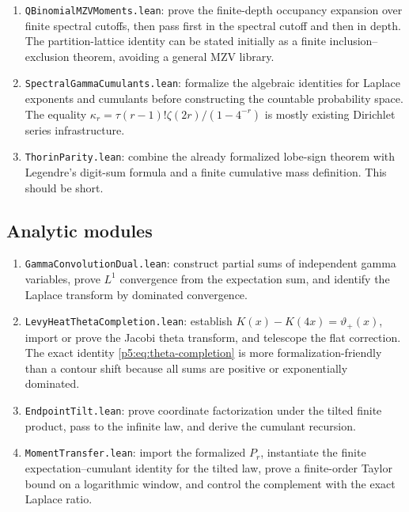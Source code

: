\documentclass[11pt]{article}
\numberwithin{equation}{section}
\theoremstyle{definition}
\theoremstyle{remark}
\begin{document}
\begin{enumerate}
\item \texttt{QBinomialMZVMoments.lean}: prove the finite-depth occupancy
      expansion over finite spectral cutoffs, then pass first in the spectral
      cutoff and then in depth.  The partition-lattice identity can be stated
      initially as a finite inclusion--exclusion theorem, avoiding a general
      MZV library.
\item \texttt{SpectralGammaCumulants.lean}: formalize the algebraic identities
      for Laplace exponents and cumulants before constructing the countable
      probability space.  The equality
      $\kappa_r=\tau(r-1)!\zeta(2r)/(1-4^{-r})$ is mostly existing Dirichlet
      series infrastructure.
\item \texttt{ThorinParity.lean}: combine the already formalized lobe-sign
      theorem with Legendre's digit-sum formula and a finite cumulative mass
      definition.  This should be short.
\end{enumerate}

\subsection{Analytic modules}

\begin{enumerate}
\item \texttt{GammaConvolutionDual.lean}: construct partial sums of independent
      gamma variables, prove $L^1$ convergence from the expectation sum, and
      identify the Laplace transform by dominated convergence.
\item \texttt{LevyHeatThetaCompletion.lean}: establish
      $K(x)-K(4x)=\vartheta_+(x)$, import or prove the Jacobi theta transform,
      and telescope the flat correction.  The exact identity
      \cref{p5:eq:theta-completion} is more formalization-friendly than a contour
      shift because all sums are positive or exponentially dominated.
\item \texttt{EndpointTilt.lean}: prove coordinate factorization under the
      tilted finite product, pass to the infinite law, and derive the cumulant
      recursion.
\item \texttt{MomentTransfer.lean}: import the formalized \(P_r\), instantiate
      the finite expectation--cumulant identity for the tilted law, prove a
      finite-order Taylor bound on a logarithmic window, and control the
      complement with the exact Laplace ratio.
\end{enumerate}
\end{document}
